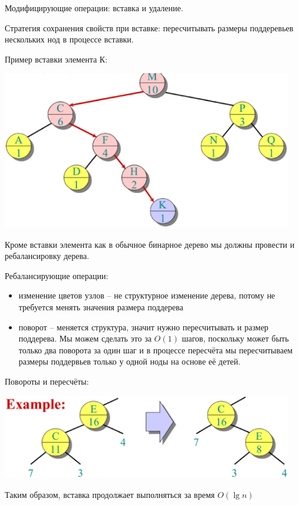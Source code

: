 \documentclass[a4paper,11pt]{article}
\begin{document}
Модифицирующие операции: вставка и удаление.

Стратегия сохранения свойств при вставке: пересчитывать размеры поддеревьев
нескольких нод в процессе вставки.

Пример вставки элемента К:
\begin{center}
\includegraphics[width=5in]{lecture11/tree3.eps}
\end{center}

Кроме вставки элемента как в обычное бинарное дерево мы должны провести и
ребалансировку дерева.

Ребалансирующие операции:
\begin{itemize}
\item изменение цветов узлов -- не структурное изменение дерева, потому не
  требуется менять значения размера поддерева
\item поворот -- меняется структура, значит нужно пересчитывать и размер
  поддерева. Мы можем сделать это за $O(1)$ шагов, поскольку может быть только
  два поворота за один шаг и в процессе пересчёта мы пересчитываем размеры
  поддервьев только у одной ноды на основе её детей.
\end{itemize}

Повороты и пересчёты:
\begin{center}
\includegraphics[width=5in]{lecture11/rotation.eps}
\end{center}

Таким образом, вставка продолжает выполняться за время $O(\lg n)$
\end{document}
